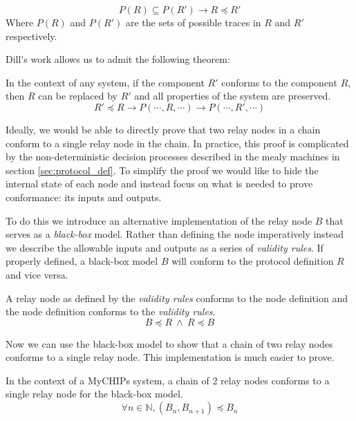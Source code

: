 \documentclass[runningheads]{llncs}
\begin{document}
\begin{definition}[Conformance]
\label{def:conformance}
$$P(R) \subseteq P(R') \longrightarrow R \preceq R'$$
Where $P(R)$ and $P(R')$ are the sets of possible traces in $R$ and $R'$ respectively. 
\end{definition}

Dill's work allows us to admit the following theorem: 
\begin{theorem}
\label{theorem:dill}
 In the context of any system, if the component $R'$ conforms to the component $R$, then $R$ can be replaced by $R'$ and all properties of the system are preserved.
$$R' \preceq R \longrightarrow P(\dotsm, R, \dotsm) \longrightarrow P(\dotsm, R', \dotsm)
$$
\end{theorem}

Ideally, we would be able to directly prove that two relay nodes in a chain conform to a single relay node in the chain. In practice, this proof is complicated by the non-deterministic decision processes described in the mealy machines in section \ref{sec:protocol_def}. To simplify the proof we would like to hide the internal state of each node and instead focus on what is needed to prove conformance: its inputs and outputs.

To do this we introduce an alternative implementation of the relay node $B$ that serves as a \emph{black-box} model. Rather than defining the node imperatively instead we describe the allowable inputs and outputs as a series of \emph{validity rules}. If properly defined, a black-box model $B$ will conform to the protocol definition $R$ and vice versa.

\begin{lemma}
\label{lemma:ind_cof_model}
A relay node as defined by the \emph{validity rules} conforms to the node definition and the node definition conforms to the \emph{validity rules}.
$$B \preceq R\ 
\wedge\ 
R \preceq B$$
\end{lemma}

Now we can use the black-box model to show that a chain of two relay nodes conforms to a single relay node. This implementation is much easier to prove.

\begin{lemma}
\label{lemma:chain_conform}
In the context of a MyCHIPs system, a chain of 2 relay nodes conforms to a single relay node for the black-box model.
$$\forall n \in \mathds{N}, (B_n, B_{n+1}) \preceq B_n
$$
\end{lemma}
\end{document}
